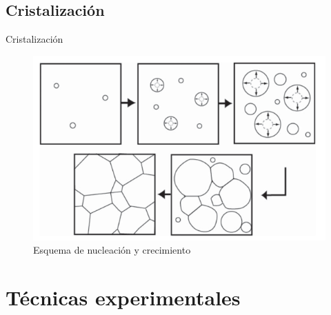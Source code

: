 \documentclass[11pt]{beamer}
\begin{document}
	\subsection{Cristalización}
		\begin{frame}{Cristalización}
			\begin{figure}
				\includegraphics[scale=0.3]{img/cristalization.png}
				\caption{Esquema de nucleación y crecimiento}
			\end{figure}
		\end{frame}

\section{Técnicas experimentales}
\end{document}
